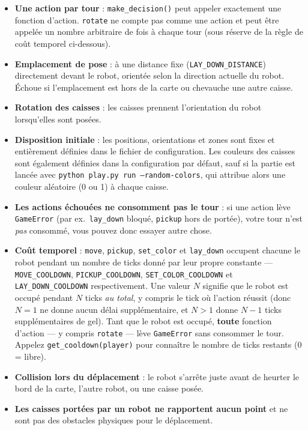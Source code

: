 \documentclass[11pt,a4paper]{article}
\newcommand{\code}[1]{\texttt{#1}}
\newcommand{\func}[1]{\texttt{#1}}
\begin{document}
\begin{itemize}
    \item \textbf{Une action par tour} : \func{make\_decision()} peut
          appeler exactement une fonction d'action. \func{rotate} ne compte
          pas comme une action et peut être appelée un nombre arbitraire de
          fois à chaque tour (sous réserve de la règle de coût temporel
          ci-dessous).
    \item \textbf{Emplacement de pose} : à une distance fixe
          (\code{LAY\_DOWN\_DISTANCE}) directement devant le robot,
          orientée selon la direction actuelle du robot. Échoue si
          l'emplacement est hors de la carte ou chevauche une autre caisse.
    \item \textbf{Rotation des caisses} : les caisses prennent l'orientation
          du robot lorsqu'elles sont posées.
    \item \textbf{Disposition initiale} : les positions, orientations et
          zones sont fixes et entièrement définies dans le fichier de
          configuration. Les couleurs des caisses sont également définies
          dans la configuration par défaut, sauf si la partie est lancée
          avec \code{python play.py run --random-colors}, qui attribue alors
          une couleur aléatoire (0 ou 1) à chaque caisse.
    \item \textbf{Les actions échouées ne consomment pas le tour} : si une
          action lève \code{GameError} (par ex.\ \func{lay\_down} bloqué,
          \func{pickup} hors de portée), votre tour n'est \emph{pas}
          consommé, vous pouvez donc essayer autre chose.
    \item \textbf{Coût temporel} : \func{move},
          \func{pickup}, \func{set\_color} et \func{lay\_down} occupent
          chacune le robot pendant un nombre de ticks donné par leur propre
          constante --- \code{MOVE\_COOLDOWN},
          \code{PICKUP\_COOLDOWN}, \code{SET\_COLOR\_COOLDOWN}
          et \code{LAY\_DOWN\_COOLDOWN} respectivement. Une valeur $N$
          signifie que le robot est occupé pendant $N$ ticks \emph{au total},
          y compris le tick où l'action réussit (donc $N=1$ ne donne aucun
          délai supplémentaire, et $N>1$ donne $N-1$ ticks supplémentaires de
          gel). Tant que le robot est occupé, \textbf{toute} fonction
          d'action --- y compris \func{rotate} --- lève \code{GameError} sans
          consommer le tour. Appelez \func{get\_cooldown(player)} pour connaître
          le nombre de ticks restants (0 = libre).
    \item \textbf{Collision lors du déplacement} : le robot s'arrête juste
          avant de heurter le bord de la carte, l'autre robot, ou une caisse
          posée.
    \item \textbf{Les caisses portées par un robot ne rapportent aucun point} et ne
          sont pas des obstacles physiques pour le déplacement.
\end{itemize}
\end{document}
